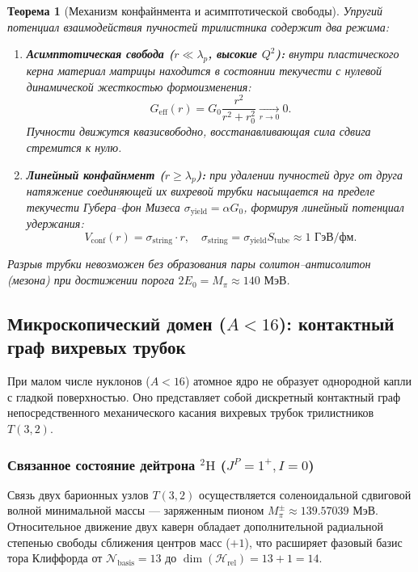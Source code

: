 \documentclass[11pt,a4paper]{article}
\newtheorem{theorem}{Теорема}
\theoremstyle{definition}
\theoremstyle{remark}
\begin{document}
\begin{theorem}[Механизм конфайнмента и асимптотической свободы]
\label{thm:confinement_asymptotic_freedom_nuclear}
Упругий потенциал взаимодействия пучностей трилистника содержит два режима:
\begin{enumerate}
\item \textbf{Асимптотическая свобода ($r \ll \lambda_p$, высокие $Q^2$):} внутри пластического керна материал матрицы находится в состоянии текучести с нулевой динамической жесткостью формоизменения:
\begin{equation}
	G_{\mathrm{eff}}(r) = G_0 \frac{r^2}{r^2 + r_0^2} \xrightarrow[r \to 0]{} 0.
\label{eq:asymptotic_freedom_core_shear}
\end{equation}
Пучности движутся квазисвободно, восстанавливающая сила сдвига стремится к нулю.
\item \textbf{Линейный конфайнмент ($r \ge \lambda_p$):} при удалении пучностей друг от друга натяжение соединяющей их вихревой трубки насыщается на пределе текучести Губера--фон Мизеса $\sigma_{\mathrm{yield}} = \alpha G_0$, формируя линейный потенциал удержания:
\begin{equation}
	V_{\mathrm{conf}}(r) = \sigma_{\mathrm{string}} \cdot r, \quad \sigma_{\mathrm{string}} = \sigma_{\mathrm{yield}} S_{\mathrm{tube}} \approx 1\text{ ГэВ/фм}.
\label{eq:linear_confinement_string}
\end{equation}
\end{enumerate}
Разрыв трубки невозможен без образования пары солитон--антисолитон (мезона) при достижении порога $2E_0 = M_\pi \approx 140\text{ МэВ}$.
\end{theorem}

\subsection{Микроскопический домен ($A < 16$): контактный граф вихревых трубок}

При малом числе нуклонов ($A < 16$) атомное ядро не образует однородной капли с гладкой поверхностью. Оно представляет собой дискретный контактный граф непосредственного механического касания вихревых трубок трилистников $T(3,2)$.

\subsubsection{Связанное состояние дейтрона $^2\mathrm{H}$ ($J^P = 1^+, I = 0$)}

Связь двух барионных узлов $T(3,2)$ осуществляется соленоидальной сдвиговой волной минимальной массы — заряженным пионом $M_\pi^\pm \approx 139.57039\text{ МэВ}$. 
Относительное движение двух каверн обладает дополнительной радиальной степенью свободы сближения центров масс ($+1$), что расширяет фазовый базис тора Клиффорда от $\mathcal{N}_{\mathrm{basis}} = 13$ до $\dim(\mathcal{H}_{\mathrm{rel}}) = 13 + 1 = 14$.
\end{document}
